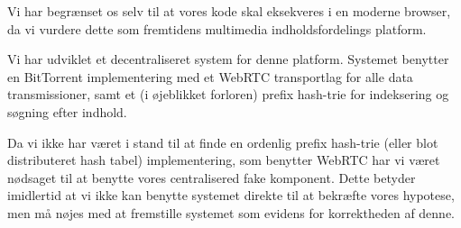 Vi har begrænset os selv til at vores kode skal eksekveres i en moderne
browser, da vi vurdere dette som fremtidens multimedia indholdsfordelings
platform.

Vi har udviklet et decentraliseret system for denne platform. Systemet benytter
en BitTorrent implementering med et WebRTC transportlag for alle data
transmissioner, samt et (i øjeblikket forloren) prefix hash-trie for
indeksering og søgning efter indhold.

Da vi ikke har været i stand til at finde en ordenlig prefix hash-trie (eller
blot distributeret hash tabel) implementering, som benytter WebRTC har vi været
nødsaget til at benytte vores centralisered fake komponent. Dette betyder 
imidlertid at vi ikke kan benytte systemet direkte til at bekræfte vores 
hypotese, men må nøjes med at fremstille systemet som evidens for korrektheden
af denne.

\endgroup			

\vfill
